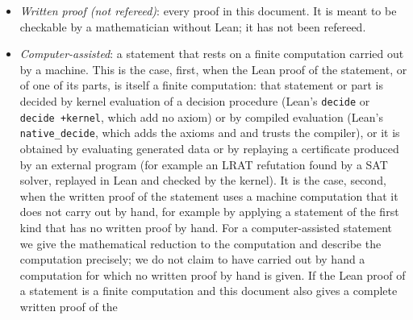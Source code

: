 \begin{itemize}
\begin{enumerate}[label=(\alph*)]
  \item a \texttt{\#guard\_msgs} command, compiled in a build whose log is saved, that pins the output of
    \texttt{\#print axioms} for the declaration or for a declaration whose statement or proof uses it.
  \end{enumerate}
  A text search of every Lean file of the repository that this document cites, and of the project files
  these import, finds none of the strings \texttt{+native}, \texttt{ofReduceBool}, \texttt{ofReduceNat}
  and \texttt{skipKernelTC}, so every application of~(a) in this document remains valid, also where it
  reports only a search for \texttt{sorry}, \texttt{admit}, \texttt{axiom} declarations and
  \texttt{native\_decide}.
  If no Lean output of any kind (compile or build log, axiom output, pinned message) is saved for a
  build that includes a file, and the label of its declarations rests only on the statement of a project
  record such as a README, we write \emph{Lean-checked according to the record}.
\item \emph{Written proof (not refereed)}: every proof in this document. It is meant to be checkable by a
  mathematician without Lean; it has not been refereed.
\item \emph{Computer-assisted}: a statement that rests on a finite computation carried out by a machine.
  This is the case, first, when the Lean proof of the statement, or of one of its parts, is itself a
  finite computation: that statement or part is decided by kernel evaluation of a decision procedure (Lean's
  \texttt{decide} or \texttt{decide +kernel}, which add no axiom) or by compiled evaluation (Lean's
  \texttt{native\_decide}, which adds the axioms  and 
  and trusts the compiler), or it is obtained by evaluating generated data or by replaying a certificate
  produced by an external program (for example an LRAT refutation found by a SAT solver, replayed in Lean
  and checked by the kernel). It is the case, second, when the written proof of the statement uses a
  machine computation that it does not carry out by hand, for example by applying a statement of the
  first kind that has no written proof by hand. For a computer-assisted statement we give the
  mathematical reduction to the computation and describe the computation precisely; we do not claim to
  have carried out by hand a computation for which no written proof by hand is given. If the Lean proof
  of a statement is a finite computation and this document also gives a complete written proof of the

\end{itemize}
